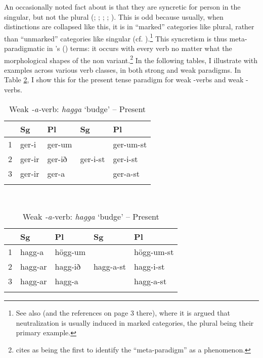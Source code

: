 \documentclass[output=paper]{langscibook}
\begin{document}
An occasionally noted fact about \stvs is that they are syncretic for person in the singular, but not the plural (\citealt[100]{Einarsson:1949xt}; \citealt[434-440]{Thomson:1987bn}; \citealt[242]{Anderson:1990sm}; \citealt[fn2]{Taraldsen:1995om}; \citealt[270]{SigurTHsson:2008dm}). This is odd because usually, when distinctions are collapsed like this, it is in ``marked'' categories like plural, rather than ``unmarked'' categories like singular (cf. \citealt[334]{Ottosson:2008b}).\footnote{See also \citet{aalberse2010:ab} (and the references on page 3 there), where it is argued that neutralization is usually induced in marked categories, the plural being their primary example.}  This syncretism is thus meta-paradigmatic in \citeauthor{Harley:2008ul}'s (\citeyear{Harley:2008ul}) terms: it occurs with every verb no matter what the morphological shapes of the non\stin{} variant.\footnote{\citet{Harley:2008ul} cites \citet{Williams:1994zd} as being the first to identify the ``meta-paradigm'' as a phenomenon.}
 In the following tables, I illustrate with examples across various verb classes, in both strong and weak paradigms. In Table \ref{woodweak}, I show this for the present tense paradigm for weak -verbs and weak -verbs.


\begin{table}
\caption{Weak verbs} \label{woodweak}
\begin{subtable}{\linewidth}\centering
\caption{Weak \textit{-i-}verb: \textit{gera} `do' -- Present}
\begin{tabular}{*5{l}}
\lsptoprule
  & {Sg} & {Pl}  & {Sg} & {Pl} \\\midrule
1 & ger-i & ger-um  	&  		&  ger-um-st \\
2 & ger-ir & ger-ið 		& ger-i-st 	&  ger-i-st  \\
3 & ger-ir  & ger-a 		& 		& ger-a-st  \\
\lspbottomrule
\end{tabular}
\end{subtable}\medskip\\
\begin{subtable}{\linewidth}\centering
\caption{Weak \textit{-a-}verb: \textit{hagga} `budge' -- Present}
\begin{tabular}{*5{l}}
\lsptoprule
  & {Sg} & {Pl}  & {Sg} & {Pl} \\\midrule
1 & hagg-a & högg-um  &   &  högg-um-st \\
2 & hagg-ar & hagg-ið & hagg-a-st &  hagg-i-st  \\
3 & hagg-ar  & hagg-a &       & hagg-a-st \\\lspbottomrule
\end{tabular}
\end{subtable}
\end{table}
\end{document}
